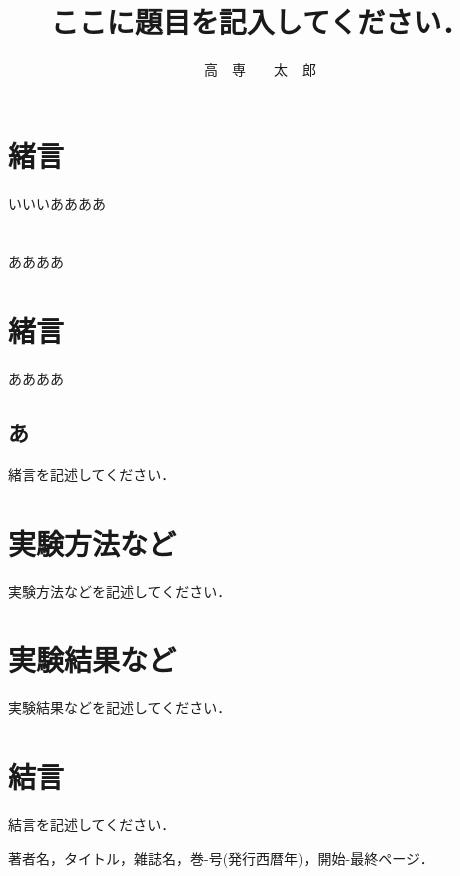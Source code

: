 \documentclass{advanced}
\title{ここに題目を記入してください．}
\author{高　専　　太　郎}
\begin{document}
\maketitle

\section{緒言}
\hbox{いいい}ああああ

\section{}

ああああ

\section*{緒言}

ああああ

\subsection{あ}

緒言を記述してください．

\section{実験方法など}

実験方法などを記述してください．

\section{実験結果など}

実験結果などを記述してください．

\section{結言}

結言を記述してください．

\begin{thebibliography}{99}
	著者名，タイトル，雑誌名，巻-号(発行西暦年)，開始-最終ページ．
\end{thebibliography}
\end{document}
